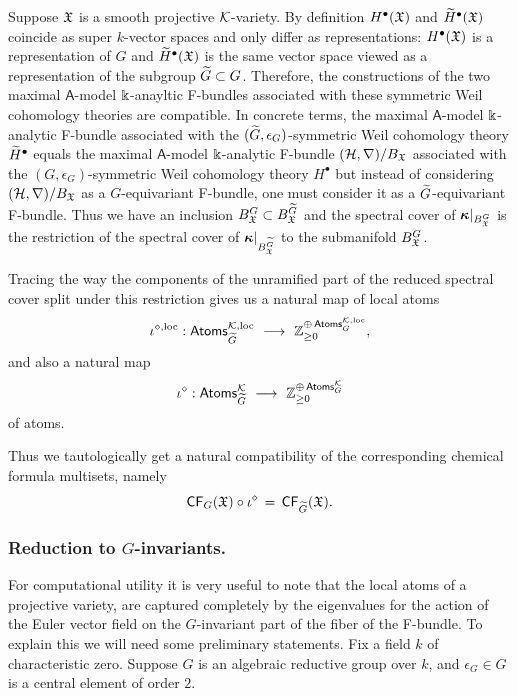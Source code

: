 \documentclass[twoside,leqno]{article}
\numberwithin{equation}{section}
\theoremstyle{plain}
\theoremstyle{definition}
\begin{document}
Suppose $\mathfrak X$ is  a smooth projective $\mathcal K$-variety. By definition 
$H^{\bullet}(\mathfrak X)$ and $\widetilde H^{\bullet}(\mathfrak X)$ coincide as super $k$-vector spaces and only differ as representations: $H^{\bullet}(\mathfrak X)$ is a representation of $G$ and $\widetilde H^{\bullet}(\mathfrak X)$  is the same vector space viewed as a representation of the subgroup $\widetilde G \subset G$. Therefore, the constructions of the two maximal 
$\mathsf{A}$-model $\Bbbk$-anayltic F-bundles associated with these symmetric Weil cohomology theories are compatible. In concrete terms, the maximal 
$\mathsf{A}$-model $\Bbbk$-analytic F-bundle associated with the $(\widetilde G,\epsilon_{G})$-symmetric Weil cohomology theory $\widetilde H^{\bullet}$ equals the maximal 
$\mathsf{A}$-model $\Bbbk$-analytic F-bundle $(\mathcal H,\nabla)/B_{\mathfrak X}$ associated with the $(G,\epsilon_{G})$-symmetric Weil cohomology theory $H^{\bullet}$ but instead of considering 
$(\mathcal H,\nabla)/B_{\mathfrak X}$ as a $G$-equivariant F-bundle, one must consider it as a $\widetilde G$-equivariant F-bundle. Thus we have an inclusion $B_{\mathfrak X}^{G} \subset B_{\mathfrak X}^{\widetilde G}$ and the spectral cover of $\boldsymbol{\kappa}|_{B_{\mathfrak X}^{G}}$ is the restriction of the spectral cover of 
$\boldsymbol{\kappa}|_{B_{\mathfrak X}^{\widetilde G}}$ to the submanifold $B_{\mathfrak X}^{G}$.

Tracing the way the components of the unramified part of the reduced  spectral cover split under this restriction gives us a natural map of local atoms
\[
\iota^{\diamond,\operatorname{loc}} : \mathsf{Atoms}_{\widetilde G}^{\mathcal K,\operatorname{loc}} \ \longrightarrow \ \mathbb Z^{\oplus \, \mathsf{Atoms}_{G}^{\mathcal K,\operatorname{loc}}}_{\geq 0},
\]
and also a natural map  
\[
\iota^{\diamond} : \mathsf{Atoms}_{\tG}^{\kay} \ \longrightarrow \ 
\bbZ^{\oplus \, \mathsf{Atoms}_{G}^{\kay}}_{\geq 0}
\]
of atoms.


Thus we tautologically get a natural compatibility of the corresponding chemical formula multisets, namely
\[
\mathsf{CF}_{G}(\mathfrak X)\circ \iota^{\diamond} \, = \, \mathsf{CF}_{\widetilde G}(\mathfrak X).
\]

 
\medskip


\subsubsection{Reduction to $G$-invariants.} \label{ssec:Ginv}
For computational utility it is very useful to note that the local atoms of a projective variety, are captured completely by the eigenvalues for the action of the Euler vector field on the $G$-invariant part of the fiber of the F-bundle. To explain this we will need some preliminary statements. Fix a field $k$ of characteristic zero. Suppose $G$ is an algebraic reductive group over $k$, and $\epsilon_{G} \in G$ is a central element of order $2$.
\end{document}
